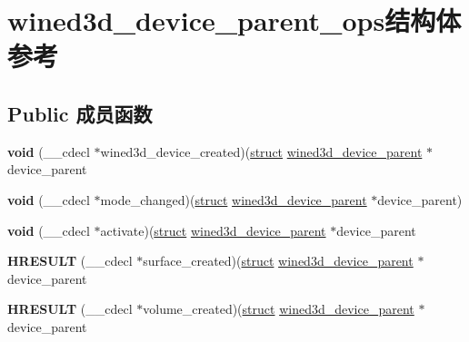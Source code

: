 \hypertarget{structwined3d__device__parent__ops}{}\section{wined3d\+\_\+device\+\_\+parent\+\_\+ops结构体 参考}
\label{structwined3d__device__parent__ops}
\subsection*{Public 成员函数}
\begin{DoxyCompactItemize}
\item 
\mbox{\label{structwined3d__device__parent__ops_a7195468127140de96dd43c48856f5ea5}} 
{\bfseries void} (\+\_\+\+\_\+cdecl $\ast$wined3d\+\_\+device\+\_\+created)(\hyperlink{interfacestruct}{struct} \hyperlink{structwined3d__device__parent}{wined3d\+\_\+device\+\_\+parent} $\ast$device\+\_\+parent
\item 
\mbox{\label{structwined3d__device__parent__ops_ad89bdc63275e3cc33d7dc647769d308f}} 
{\bfseries void} (\+\_\+\+\_\+cdecl $\ast$mode\+\_\+changed)(\hyperlink{interfacestruct}{struct} \hyperlink{structwined3d__device__parent}{wined3d\+\_\+device\+\_\+parent} $\ast$device\+\_\+parent)
\item 
\mbox{\label{structwined3d__device__parent__ops_a3360e1a0847d06348c5239714994dbe3}} 
{\bfseries void} (\+\_\+\+\_\+cdecl $\ast$activate)(\hyperlink{interfacestruct}{struct} \hyperlink{structwined3d__device__parent}{wined3d\+\_\+device\+\_\+parent} $\ast$device\+\_\+parent
\item 
\mbox{\label{structwined3d__device__parent__ops_a839c6158190756f2e0c8f22a96c83df3}} 
{\bfseries H\+R\+E\+S\+U\+LT} (\+\_\+\+\_\+cdecl $\ast$surface\+\_\+created)(\hyperlink{interfacestruct}{struct} \hyperlink{structwined3d__device__parent}{wined3d\+\_\+device\+\_\+parent} $\ast$device\+\_\+parent
\item 
\mbox{\label{structwined3d__device__parent__ops_a73a922a8867fed6ac98ae2a5ce554d2d}} 
{\bfseries H\+R\+E\+S\+U\+LT} (\+\_\+\+\_\+cdecl $\ast$volume\+\_\+created)(\hyperlink{interfacestruct}{struct} \hyperlink{structwined3d__device__parent}{wined3d\+\_\+device\+\_\+parent} $\ast$device\+\_\+parent

\end{DoxyCompactItemize}
